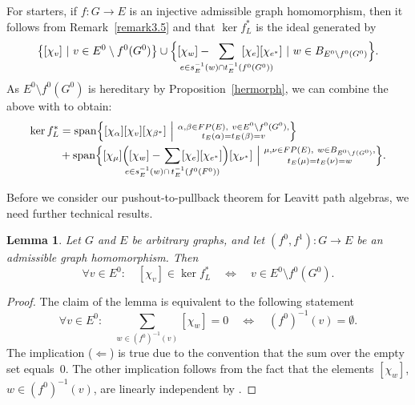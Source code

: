 \documentclass[12pt,times,a4paper]{amsart}
\newtheorem{lemma}[theorem]{Lemma}
\numberwithin{equation}{section}
\numberwithin{equation}{section}
\begin{document}
For starters, if $f\colon G\to E$ is an injective admissible graph homomorphism, then it follows from Remark~\ref{remark3.5} and \cite[Corollary~2.4.13(ii)]{aasm17}
that  $\ker f_L^*$ is the ideal generated by
\begin{equation}
\left\{[\chi_v]~|~v\in E^0\setminus f^0(G^0)\right\}\cup \Big{\{}[\chi_w]-\!\!\!\!\!\!\!\!\!\!\!\!\!\!\!\!\!
\sum_{e\in s_E^{-1}(w)\cap t_E^{-1}(f^0(G^0))}\!\!\!\!\!\!\!\!\!\!\!\!\!\!\!\!\![\chi_e][\chi_{e^*}]~|
~w\in B_{E^0\setminus f^0(G^0)}\Big{\}}.
\end{equation}
As $E^0\setminus f^0(G^0)$ is hereditary by Proposition~\ref{hermorph}, we can combine the above with  \cite[Lemma~2.4.6]{aasm17} to obtain:
\begin{align}\label{kerspan}
\ker f^*_L&={\rm span}\Big{\{}[\chi_\alpha][\chi_v][\chi_{\beta^*}]~\Big{|}~\substack{\alpha,\beta\in FP(E),~v\in E^0\setminus 
f^0(G^0),\\t_E(\alpha)=t_E(\beta)=v}\Big{\}}\nonumber\\
&+{\rm span}\Big{\{}[\chi_\mu]\Big{(}[\chi_w]-\hspace*{-12mm}\sum_{e\in s^{-1}_E(w)\cap\, t^{-1}_E(f^0(F^0))}
\hspace*{-12mm}[\chi_e][\chi_{e^*}]\Big{)}
[\chi_{\nu^*}]~\Big{|}~\substack{\mu,\nu\in FP(E),~w\in B_{E^0\setminus f(G^0)},\\t_E(\mu)=t_E(\nu)=w}\Big{\}}.
\end{align}

Before we consider our pushout-to-pullback theorem for Leavitt path algebras, we need further technical results.  
\begin{lemma}\label{kerver}
Let $G$ and $E$ be arbitrary graphs, and let $(f^0,f^1)\colon G\to E$ be an admissible graph homomorphism.
Then
\begin{equation*}
\forall v\in E^0\colon\quad [\chi_v]\in\ker f^*_L\quad\iff\quad v\in E^0\setminus f^0(G^0).
\end{equation*}
\end{lemma}
\begin{proof}
The claim of the lemma is equivalent to the following statement
\begin{equation}
\forall v\in E^0\colon\quad \sum_{w\in(f^0)^{-1}(v)}[\chi_w]=0\quad\iff\quad (f^0)^{-1}(v)=\emptyset.
\end{equation} 
The implication ($\Leftarrow$) is true due to the convention that the sum over the empty set equals~$0$. The other implication follows from the fact that the elements $[\chi_w]$, $w\in(f^0)^{-1}(v)$, are linearly 
independent by \cite[Corollary~1.5.12]{aasm17}.
\end{proof}
\end{document}
